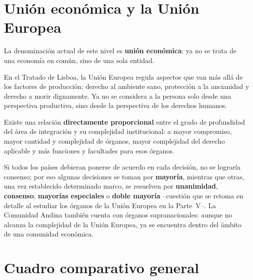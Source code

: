 \documentclass[12pt,oneside]{book}
\begin{document}
\section{Unión económica y la Unión Europea}

La denominación actual de este nivel es \textbf{unión económica}: ya no se trata de una economía en común, sino de una sola entidad.

\begin{nota}
En el Tratado de Lisboa, la Unión Europea regula aspectos que van más allá de los factores de producción: derecho al ambiente sano, protección a la ancianidad y derecho a morir dignamente. Ya no se considera a la persona solo desde una perspectiva productiva, sino desde la perspectiva de los derechos humanos.
\end{nota}

\begin{importante}
Existe una relación \textbf{directamente proporcional} entre el grado de profundidad del área de integración y su complejidad institucional: a mayor compromiso, mayor cantidad y complejidad de órganos, mayor complejidad del derecho aplicable y más funciones y facultades para esos órganos.
\end{importante}

Si todos los países debieran ponerse de acuerdo en cada decisión, no se lograría consenso; por eso algunas decisiones se toman por \textbf{mayoría}, mientras que otras, una vez establecido determinado marco, se resuelven por \textbf{unanimidad}, \textbf{consenso}, \textbf{mayorías especiales} o \textbf{doble mayoría} --cuestión que se retoma en detalle al estudiar los órganos de la Unión Europea en la Parte~V--. La Comunidad Andina también cuenta con órganos supranacionales: aunque no alcanza la complejidad de la Unión Europea, ya se encuentra dentro del ámbito de una comunidad económica.

\section{Cuadro comparativo general}
\end{document}
